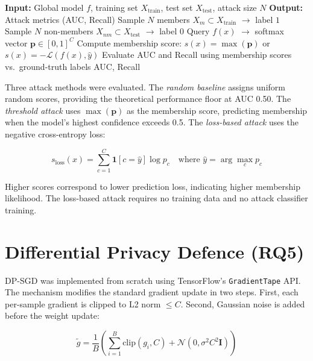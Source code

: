 \documentclass[12pt, a4paper]{report}
\begin{document}
\begin{algorithm}[H]
\caption{Black-Box Membership Inference Attack}
\label{alg:mia}
\begin{algorithmic}[1]
\State \textbf{Input:} Global model $f$, training set $X_{\text{train}}$, test set $X_{\text{test}}$, attack size $N$
\State \textbf{Output:} Attack metrics (AUC, Recall)
\State Sample $N$ members $X_m \subset X_{\text{train}}$ $\rightarrow$ label $1$
\State Sample $N$ non-members $X_{nm} \subset X_{\text{test}}$ $\rightarrow$ label $0$
    \State Query $f(x)$ $\rightarrow$ softmax vector $\mathbf{p} \in [0,1]^C$
    \State Compute membership score: $s(x) = \max(\mathbf{p})$ or $s(x) = -\mathcal{L}(f(x), \hat{y})$
\EndFor
\State Evaluate AUC and Recall using membership scores vs.\ ground-truth labels
\State \Return AUC, Recall
\end{algorithmic}
\end{algorithm}

Three attack methods were evaluated. The \textit{random
baseline} assigns uniform random scores, providing the theoretical performance
floor at AUC 0.50. The \textit{threshold attack} uses $\max(\mathbf{p})$ as the
membership score, predicting membership when the model's highest confidence
exceeds 0.5. The \textit{loss-based attack} uses the negative cross-entropy loss:

\begin{equation}
  s_{\text{loss}}(x) = \sum_{c=1}^{C} \mathbf{1}[c = \hat{y}] \log p_c
  \quad \text{where } \hat{y} = \arg\max_c p_c
\end{equation}

\noindent Higher scores correspond to lower prediction loss, indicating higher
membership likelihood. The loss-based attack requires no training data and no attack classifier training.

\section{Differential Privacy Defence (RQ5)}
\label{sec:dpmethod}

DP-SGD was implemented from scratch using TensorFlow's \texttt{GradientTape} API.
The mechanism modifies the standard gradient update in two steps. First, each
per-sample gradient is clipped to L2 norm $\leq C$. Second, Gaussian noise is
added before the weight update:

\begin{equation}
  \tilde{g} = \frac{1}{B} \left( \sum_{i=1}^{B} \text{clip}(g_i, C)
  + \mathcal{N}(0, \sigma^2 C^2 \mathbf{I}) \right)
\end{equation}
\end{document}
